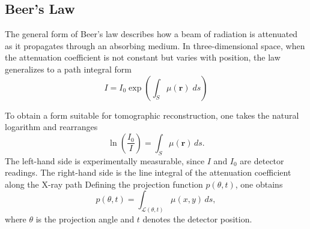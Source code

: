 \documentclass[../../../main.tex]{subfiles}
\begin{document}
\subsection{Beer's Law}
The general form of Beer’s law describes how a beam of radiation is attenuated as it propagates through an absorbing medium.
In three-dimensional space, when the attenuation coefficient is not constant but varies with position, the law generalizes to a path integral form
\begin{equation*}
    I=I_0\exp \left( \int_S \mu(\mathbf{r })\;ds \right)
\end{equation*}

To obtain a form suitable for tomographic reconstruction, one takes the natural logarithm and rearranges
\begin{equation*}
    \ln\!\left(\frac{I_0}{I}\right) = \int_{S} \mu(\mathbf{r}) \, ds.
\end{equation*}
The left-hand side is experimentally measurable, since $I$ and $I_0$ are detector readings.
The right-hand side is the line integral of the attenuation coefficient along the X-ray path
Defining the projection function $p(\theta, t)$, one obtains
\begin{equation*}
    p(\theta, t) 
    = \int_{\mathcal{L}(\theta,t)} \mu(x,y) \, ds,
\end{equation*}
where $\theta$ is the projection angle and $t$ denotes the detector position. 
\end{document}
